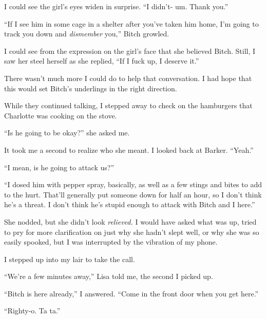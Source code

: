I could see the girl's eyes widen in surprise.  ``I didn't- um.  Thank you.''



``If I see him in some cage in a shelter after you've taken him home, I'm going to track you down and \emph{dismember} you,'' Bitch growled.



I could see from the expression on the girl's face that she believed Bitch.  Still, I saw her steel herself as she replied, ``If I fuck up, I deserve it.''



There wasn't much more I could do to help that conversation.  I had hope that this would set Bitch's underlings in the right direction.



While they continued talking, I stepped away to check on the hamburgers that Charlotte was cooking on the stove.



``Is he going to be okay?'' she asked me.



It took me a second to realize who she meant.  I looked back at Barker.  ``Yeah.''



``I mean, is he going to attack us?''



``I dosed him with pepper spray, basically, as well as a few stings and bites to add to the hurt.  That'll generally put someone down for half an hour, so I don't think he's a threat.  I don't think he's stupid enough to attack with Bitch and I here.''



She nodded, but she didn't look \emph{relieved.}  I would have asked what was up, tried to pry for more clarification on just why she hadn't slept well, or why she was so easily spooked, but I was interrupted by the vibration of my phone.



I stepped up into my lair to take the call.



``We're a few minutes away,'' Lisa told me, the second I picked up.



``Bitch is here already,'' I answered.  ``Come in the front door when you get here.''



``Righty-o.  Ta ta.''



